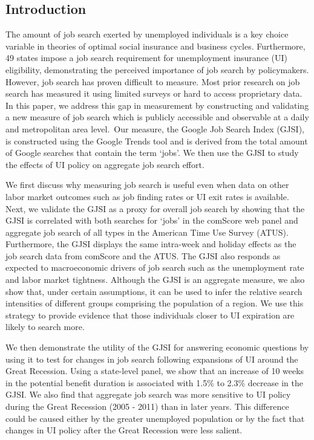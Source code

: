 \documentclass[12pt]{article}
\begin{document}
\begin{spacing}{2}
\section{Introduction} 
The amount of job search exerted by unemployed individuals is a key choice variable in theories of optimal social insurance and business cycles. Furthermore, 49 states impose a job search requirement for unemployment insurance (UI) eligibility, demonstrating the perceived importance of job search by policymakers. However, job search has proven difficult to measure. Most prior research on job search has measured it using limited surveys or hard to access proprietary data. In this paper, we address this gap in measurement by constructing and validating a new measure of job search which is publicly accessible and observable at a daily and metropolitan area level.\footnotemark \ Our measure, the Google Job Search Index (GJSI), is constructed using the Google Trends tool and is derived from the total amount of Google searches that contain the term `jobs'. We then use the GJSI to study the effects of UI policy on aggregate job search effort. 

We first discuss why measuring job search is useful even when data on other labor market outcomes such as job finding rates or UI exit rates is available. Next, we validate the GJSI as a proxy for overall job search by showing that the GJSI is correlated with both searches for `jobs' in the comScore web panel and aggregate job search of all types in the American Time Use Survey (ATUS). Furthermore, the GJSI displays the same intra-week and holiday effects as the job search data from comScore and the ATUS. The GJSI also responds as expected to macroeconomic drivers of job search such as the unemployment rate and labor market tightness. Although the GJSI is an aggregate measure, we also show that, under certain assumptions, it can be used to infer the relative search intensities of different groups comprising the population of a region. We use this strategy to provide evidence that those individuals closer to UI expiration are likely to search more.

We then demonstrate the utility of the GJSI for answering economic questions by using it to test for changes in job search following expansions of UI around the Great Recession. Using a state-level panel, we show that an increase of 10 weeks in the potential benefit duration is associated with 1.5\% to 2.3\% decrease in the GJSI. We also find that aggregate job search was more sensitive to UI policy during the Great Recession (2005 - 2011) than in later years. This difference could be caused either by the greater unemployed population or by the fact that changes in UI policy after the Great Recession were less salient.


\end{spacing}
\end{document}
